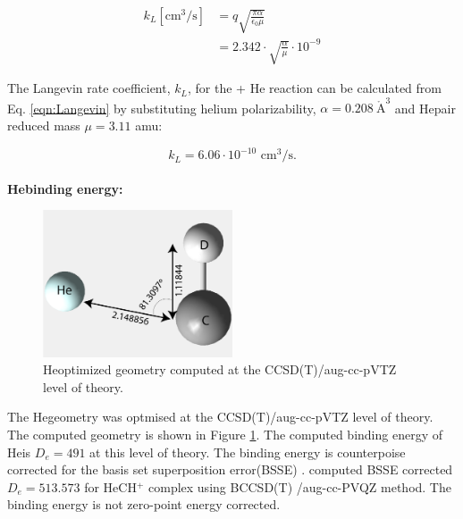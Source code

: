 \begin{equation}
    \begin{split}
        k_L [\text{cm}^3 / \text{s}] & = q \sqrt{\frac{\pi \alpha}{\epsilon _0 \mu}} \\
        &= 2.342 \cdot \sqrt{ \frac{\alpha}{\mu}} \cdot 10^{-9} 
   \end{split}
   \label{eqn:Langevin}
\end{equation}


The Langevin rate coefficient, $k_L$, for the \CD + He reaction can be calculated from Eq. \ref{eqn:Langevin} by substituting helium polarizability, $\alpha=0.208\  \mathring{\text{A}}^3$ \cite{olney_absolute_1997} and He\CD pair reduced mass $\mu=3.11$ amu:

\begin{equation}
        k_L = 6.06 \cdot 10^{-10} \text{ cm}^3 / \text{s}.
   \label{eqn:Langevin-CD+}
\end{equation}
\\
\textbf{He\CD binding energy:}\label{discussions:binding-energy:CD+}\\

\begin{figure}[!htb]
    \centering
    \includegraphics[width=0.5\textwidth]{figures/measurements/kinetics/HeCD+_geometry.pdf}
    \caption{He\CD optimized geometry computed at the CCSD(T)/aug-cc-pVTZ level of theory.}
    \label{fig:HeCD_geometry}
\end{figure}

The He\CD geometry was optmised at the CCSD(T)/aug-cc-pVTZ level of theory. The computed geometry is shown in Figure \ref{fig:HeCD_geometry}.
The computed binding energy of He\CD is $D_e=491$ \wnn at this level of theory. The binding energy is counterpoise corrected for the basis set superposition error(BSSE) \cite{boys_calculation_1970}.
\citet{stoecklin_vibrational_2008} computed BSSE corrected $D_e=513.573$ \wnn for HeCH$^+$ complex using BCCSD(T) /aug-cc-PVQZ method.
The binding energy is not zero-point energy corrected.

